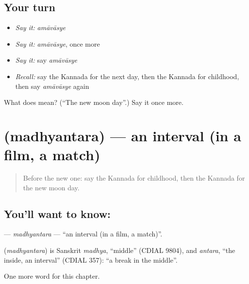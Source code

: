 \subsection*{Your turn}
\begin{itemize}
\raggedright
  \item \emph{Say it:} \emph{amāvāsye}
  \item \emph{Say it:} \emph{amāvāsye}, once more
  \item \emph{Say it:} say \emph{amāvāsye}
  \item \emph{Recall:} say the Kannada for the next day, then the Kannada for childhood, then say \emph{amāvāsye} again
\end{itemize}

\begin{tcolorbox}[breakable,colback=teal!4,colframe=teal!35!black,title={Before you move on}]
What does  mean? (\textquotedblleft{}The new moon day\textquotedblright{}.) Say it once more.
\end{tcolorbox}
\section[\texorpdfstring{\kn{ಮಧ್ಯಂತರ} (madhyantara)}{ಮಧ್ಯಂತರ (madhyantara)}]{ (madhyantara) — an interval (in a film, a match)}

\label{lesson:KA-C285-madhyantara}



\begin{quote}
Before the new one: say the Kannada for childhood, then the Kannada for the new moon day.
\end{quote}

\subsection*{You'll want to know: }
\textbf{} — \emph{madhyantara} — \textquotedblleft{}an interval (in a film, a match)\textquotedblright{}.

\begin{cousinweb}
\textbf{} (\emph{madhyantara}) is Sanskrit \emph{madhya}, \textquotedblleft{}middle\textquotedblright{} (CDIAL 9804), and \emph{antara}, \textquotedblleft{}the inside, an interval\textquotedblright{} (CDIAL 357): \textquotedblleft{}a break in the middle\textquotedblright{}.
\end{cousinweb}

\begin{grammarlens}[title={What you've built}]
One more word for this chapter.
\end{grammarlens}

